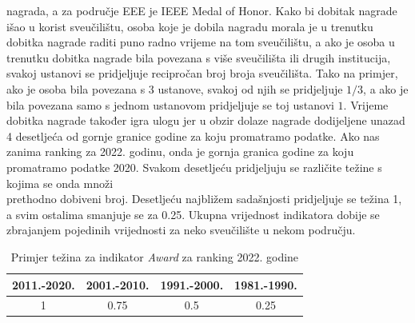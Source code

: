 \documentclass[times, utf8, zavrsni]{fer}
\begin{document}
nagrada, a za područje EEE je IEEE Medal of Honor.
Kako bi dobitak nagrade išao u korist sveučilištu, osoba koje je dobila nagradu morala je u trenutku dobitka nagrade raditi puno radno vrijeme na 
tom sveučilištu, a ako  je osoba u trenutku dobitka nagrade bila povezana s više sveučilišta ili drugih institucija, svakoj ustanovi se pridjeljuje
recipročan broj broja sveučilišta. Tako na primjer, ako je osoba bila povezana s 3 ustanove, svakoj od njih se pridjeljuje $1/3$, a ako je bila 
povezana samo s jednom ustanovom pridjeljuje se toj ustanovi $1$. 
Vrijeme dobitka nagrade također igra ulogu jer u obzir dolaze nagrade dodijeljene unazad 4 desetljeća od gornje granice godine za koju promatramo podatke.
Ako nas zanima ranking za 2022. godinu, onda je gornja granica godine za koju promatramo podatke 2020. Svakom desetljeću pridjeljuju se različite težine 
s kojima se onda množi \\prethodno dobiveni broj. Desetljeću najbližem sadašnjosti pridjeljuje se težina 1, a svim ostalima smanjuje se za 0.25.
Ukupna vrijednost indikatora dobije se zbrajanjem pojedinih vrijednosti za neko sveučilište u nekom području.

\begin{table}[htb]
    \caption{Primjer težina za indikator \emph{Award} za ranking 2022. godine}
        \label{tbl:konstante2}
        \centering
        \begin{tabular}{cccc} \hline
        2011.-2020. & 2001.-2010. & 1991.-2000. & 1981.-1990.\\ \hline
        1&0.75&0.5&0.25\\
        \end{tabular}
        \end{table}    
        \FloatBarrier
\newpage
\end{document}
